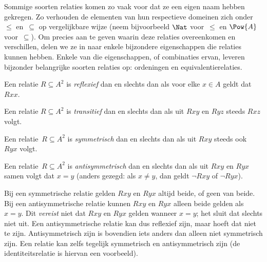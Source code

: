 \documentclass[openany]{memoir}
\begin{document}

\begin{intro}
Sommige soorten relaties komen zo vaak voor dat ze een eigen naam
hebben gekregen. Zo verhouden de elementen van hun respectieve
domeinen zich onder $\le$ en~$\subseteq$ op vergelijkbare wijze (neem
bijvoorbeeld $\Nat$ voor~$\le$ en $\Pow{A}$ voor~$\subseteq$). Om
precies aan te geven waarin deze relaties overeenkomen en verschillen,
delen we ze in naar enkele bijzondere eigenschappen die relaties
kunnen hebben. Enkele van die eigenschappen, of combinaties ervan,
leveren bijzonder belangrijke soorten relaties op: ordeningen en
equivalentierelaties.
\end{intro}

\begin{defn}[Reflexiviteit]
Een relatie $R \subseteq A^2$ is \emph{reflexief} dan en slechts dan
als voor elke $x \in A$ geldt dat $Rxx$.
\end{defn}

\begin{defn}[Transitiviteit]
Een relatie $R \subseteq A^2$ is \emph{transitief} dan en slechts dan
als uit $Rxy$ en $Ryz$ steeds $Rxz$ volgt.
\end{defn}

\begin{defn}[Symmetrie]
Een relatie~$R \subseteq A^2$ is \emph{symmetrisch} dan en slechts dan
als uit $Rxy$ steeds ook~$Ryx$ volgt.
\end{defn}

\begin{defn}[Antisymmetrie]
Een relatie~$R \subseteq A^2$ is \emph{an\-ti\-symmetrisch} dan en
slechts dan als uit $Rxy$ en $Ryx$ samen volgt dat $x=y$ (anders
gezegd: als $x\neq y$, dan geldt $\lnot Rxy$ of $\lnot Ryx$).
\end{defn}

\begin{explain}
Bij een symmetrische relatie gelden $Rxy$ en $Ryx$ altijd beide, of
geen van beide. Bij een antisymmetrische relatie kunnen $Rxy$ en $Ryx$
alleen beide gelden als $x = y$. Dit \emph{vereist} niet dat $Rxy$ en $Ryx$ gelden
wanneer $x = y$; het sluit dat slechts niet uit. Een
antisymmetrische relatie kan dus reflexief zijn, maar hoeft dat niet te
zijn. Antisymmetrisch zijn is bovendien iets anders dan alleen niet
symmetrisch zijn. Een relatie kan zelfs tegelijk symmetrisch en
antisymmetrisch zijn (de identiteitsrelatie is hiervan een voorbeeld).
\end{explain}
\end{document}
